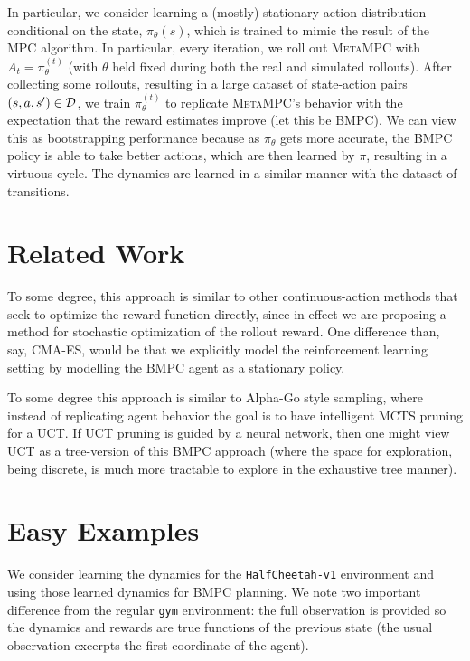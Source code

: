 \documentclass{article}
\begin{document}
In particular, we consider learning a (mostly) stationary action distribution conditional on the state, $\pi_\theta(s)$, which is trained to mimic the result of the MPC algorithm. In particular, every iteration, we roll out \textsc{MetaMPC} with $A_t=\pi_\theta^{(t)}$ (with $\theta$ held fixed during both the real and simulated rollouts). After collecting some rollouts, resulting in a large dataset of state-action pairs $(s,a, s')\in\mathcal{D}$, we train $\pi_\theta^{(t)}$ to replicate \textsc{MetaMPC}'s behavior with the expectation that the reward estimates improve (let this be BMPC). We can view this as bootstrapping performance because as $\pi_\theta$ gets more accurate, the BMPC policy is able to take better actions, which are then learned by $\pi$, resulting in a virtuous cycle. The dynamics are learned in a similar manner with the dataset of transitions.

\section{Related Work}

To some degree, this approach is similar to other continuous-action methods that seek to optimize the reward function directly, since in effect we are proposing a method for stochastic optimization of the rollout reward. One difference than, say, CMA-ES, would be that we explicitly model the reinforcement learning setting by modelling the BMPC agent as a stationary policy.

To some degree this approach is similar to Alpha-Go style sampling, where instead of replicating agent behavior the goal is to have intelligent MCTS pruning for a UCT. If UCT pruning is guided by a neural network, then one might view UCT as a tree-version of this BMPC approach (where the space for exploration, being discrete, is much more tractable to explore in the exhaustive tree manner).

\section{Easy Examples}

We consider learning the dynamics for the \texttt{HalfCheetah-v1} environment and using those learned dynamics for BMPC planning. We note two important difference from the regular \texttt{gym} environment: the full observation is provided so the dynamics and rewards are true functions of the previous state (the usual observation excerpts the first coordinate of the agent).
\end{document}
